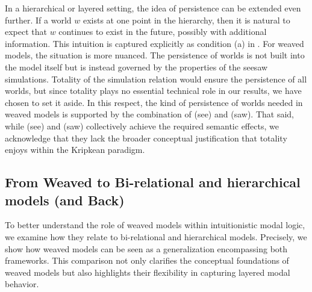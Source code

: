 In a hierarchical or layered setting, the idea of persistence can be extended even further. If a world $w$ exists at one point in the hierarchy, then it is natural to expect that $w$ continues to exist in the future, possibly with additional information. This intuition is captured explicitly as condition (a) in .
For weaved models, the situation is more nuanced. The persistence of worlds is not built into the model itself but is instead governed by the properties of the seesaw simulations. Totality of the simulation relation would ensure the persistence of all worlds, but since totality plays no essential technical role in our results, we have chosen to set it aside. In this respect, the kind of persistence of worlds needed in weaved models is supported by the combination of (see) and (saw).
That said, while (see) and (saw) collectively achieve the required semantic effects, we acknowledge that they lack the broader conceptual justification that totality enjoys within the Kripkean paradigm.


\subsection{From Weaved to Bi-relational and hierarchical models (and Back)}

To better understand the role of weaved models within intuitionistic modal logic, we examine how they relate to bi-relational and hierarchical models. Precisely, we show how weaved models can be seen as a generalization encompassing both frameworks. This comparison not only clarifies the conceptual foundations of weaved models but also highlights their flexibility in capturing layered modal behavior.


